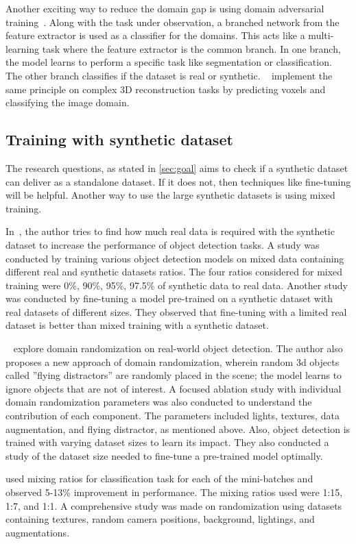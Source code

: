 Another exciting way to reduce the domain gap is using domain adversarial training~\cite{ganin2016domainadversarial}.
Along with the task under observation, a branched network from the feature extractor is used as a classifier for the domains.
This acts like a multi-learning task where the feature extractor is the common branch.
In one branch, the model learns to perform a specific task like segmentation or classification.
The other branch classifies if the dataset is real or synthetic.
~\cite{pinheiro2019domainadaptive} implement the same principle on complex 3D reconstruction tasks by predicting voxels and classifying the image domain.

\subsection{Training with synthetic dataset}\label{subsec:training-with-synthetic-dataset}
The research questions, as stated in \autoref{sec:goal} aims to check if a synthetic dataset can deliver as a standalone dataset.
If it does not, then techniques like fine-tuning will be helpful.
Another way to use the large synthetic datasets is using mixed training.

In~\cite{nowruzi2019real},  the author tries to find how much real data is required with the synthetic dataset to increase the performance of object detection tasks.
A study was conducted by training various object detection models on mixed data containing different real and synthetic datasets ratios.
The four ratios considered for mixed training were 0\%, 90\%, 95\%, 97.5\% of synthetic data to real data.
Another study was conducted by fine-tuning a model pre-trained on a synthetic dataset with real datasets of different sizes.
They observed that fine-tuning with a limited real dataset is better than mixed training with a synthetic dataset.

~\cite{Tremblay2018TrainingDN}  explore domain randomization on real-world object detection.
The author also proposes a new approach of domain randomization, wherein random 3d objects called ”flying distractors” are randomly placed in the scene;
the model learns to ignore objects that are not of interest.
A focused ablation study with individual domain randomization parameters was also conducted to understand the contribution of each component.
The parameters included lights, textures, data augmentation, and flying distractor, as mentioned above.
Also, object detection is trained with varying dataset sizes to learn its impact.
They also conducted a study of the dataset size needed to fine-tune a pre-trained model optimally.

\cite{2018LearningIC} used mixing ratios for classification task for each of the mini-batches and observed 5-13\% improvement in performance.
The mixing ratios used were 1:15, 1:7, and 1:1.
A comprehensive study was made on randomization using datasets containing textures, random camera positions, background, lightings, and augmentations.

